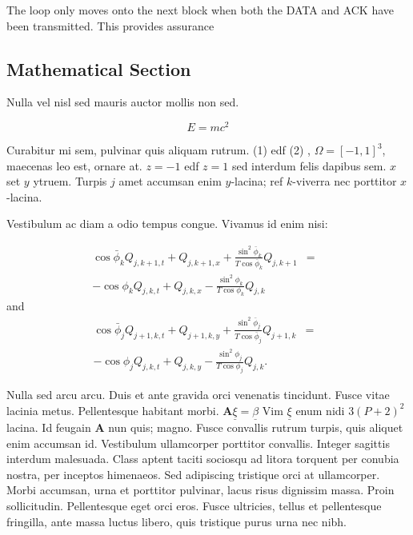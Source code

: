 \documentclass[a0,landscape]{a0poster}
\begin{document}
\begin{multicols}{4}
The loop only moves onto the next block when both the DATA and ACK have been transmitted. This provides assurance

\subsection*{Mathematical Section}

Nulla vel nisl sed mauris auctor mollis non sed. 

\begin{equation}
E = mc^{2}
\label{eqn:Einstein}
\end{equation}

Curabitur mi sem, pulvinar quis aliquam rutrum. (1) edf (2)
, $\Omega=[-1,1]^3$, maecenas leo est, ornare at. $z=-1$ edf $z=1$ sed interdum felis dapibus sem. $x$ set $y$ ytruem. 
Turpis $j$ amet accumsan enim $y$-lacina; 
ref $k$-viverra nec porttitor $x$-lacina. 

Vestibulum ac diam a odio tempus congue. Vivamus id enim nisi:

\begin{eqnarray}
\cos\bar{\phi}_k Q_{j,k+1,t} + Q_{j,k+1,x}+\frac{\sin^2\bar{\phi}_k}{T\cos\bar{\phi}_k} Q_{j,k+1} &=&\nonumber\\ 
-\cos\phi_k Q_{j,k,t} + Q_{j,k,x}-\frac{\sin^2\phi_k}{T\cos\phi_k} Q_{j,k}\label{edgek}
\end{eqnarray}
and
\begin{eqnarray}
\cos\bar{\phi}_j Q_{j+1,k,t} + Q_{j+1,k,y}+\frac{\sin^2\bar{\phi}_j}{T\cos\bar{\phi}_j} Q_{j+1,k}&=&\nonumber \\
-\cos\phi_j Q_{j,k,t} + Q_{j,k,y}-\frac{\sin^2\phi_j}{T\cos\phi_j} Q_{j,k}.\label{edgej}
\end{eqnarray} 

Nulla sed arcu arcu. Duis et ante gravida orci venenatis tincidunt. Fusce vitae lacinia metus. Pellentesque habitant morbi. $\mathbf{A}\underline{\xi}=\underline{\beta}$ Vim $\underline{\xi}$ enum nidi $3(P+2)^{2}$ lacina. Id feugain $\mathbf{A}$ nun quis; magno. Fusce convallis rutrum turpis, quis aliquet enim accumsan id. Vestibulum ullamcorper porttitor convallis. Integer sagittis interdum malesuada. Class aptent taciti sociosqu ad litora torquent per conubia nostra, per inceptos himenaeos. Sed adipiscing tristique orci at ullamcorper. Morbi accumsan, urna et porttitor pulvinar, lacus risus dignissim massa. Proin sollicitudin. Pellentesque eget orci eros. Fusce ultricies, tellus et pellentesque fringilla, ante massa luctus libero, quis tristique purus urna nec nibh.


\end{multicols}
\end{document}
